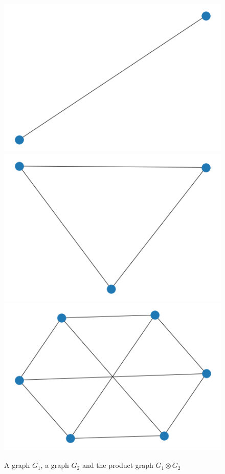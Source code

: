 \documentclass{article}
\theoremstyle{definition}
\begin{document}
\begin{figure}[!htb]
	\begin{multicols}{3}
		\includegraphics[width=\linewidth]{data/prod_graph/g1.png}
		\includegraphics[width=\linewidth]{data/prod_graph/g2.png}
		\includegraphics[width=\linewidth]{data/prod_graph/gx.png}
	\end{multicols}
	\caption{A graph $G_1$, a graph $G_2$ and the product graph $G_1 \otimes G_2$}
\end{figure}
\end{document}
